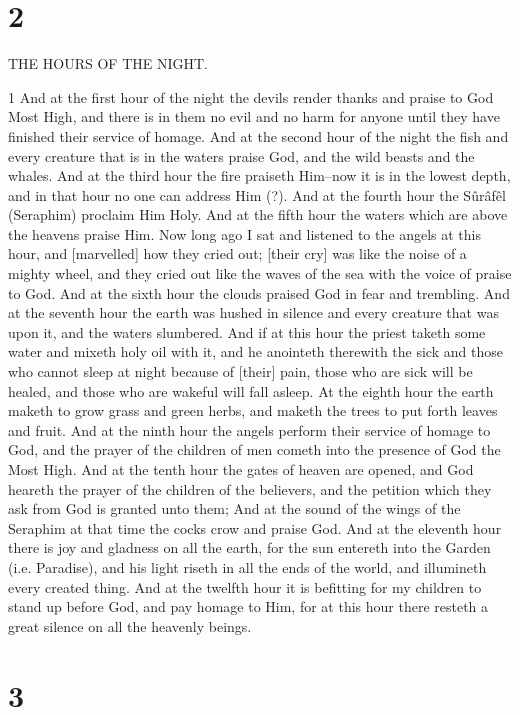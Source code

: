 \chapter{2}

\par THE HOURS OF THE NIGHT.

\par 1 And at the first hour of the night the devils render thanks and praise to God Most High, and there is in them no evil and no harm for anyone until they have finished their service of homage. And at the second hour of the night the fish and every creature that is in the waters praise God, and the wild beasts and the whales. And at the third hour the fire praiseth Him--now it is in the lowest depth, and in that hour no one can address Him (?). And at the fourth hour the Sûrâfêl (Seraphim) proclaim Him Holy. And at the fifth hour the waters which are above the heavens praise Him. Now long ago I sat and listened to the angels at this hour, and [marvelled] how they cried out; [their cry] was like the noise of a mighty wheel, and they cried out like the waves of the sea with the voice of praise to God. And at the sixth hour the clouds praised God in fear and trembling. And at the seventh hour the earth was hushed in silence and every creature that was upon it, and the waters slumbered. And if at this hour the priest taketh some water and mixeth holy oil with it, and he anointeth therewith the sick and those who cannot sleep at night because of [their] pain, those who are sick will be healed, and those who are wakeful will fall asleep. At the eighth hour the earth maketh to grow grass and green herbs, and maketh the trees to put forth leaves and fruit. And at the ninth hour the angels perform their service of homage to God, and the prayer of the children of men cometh into the presence of God the Most High. And at the tenth hour the gates of heaven are opened, and God heareth the prayer of the children of the believers, and the petition which they ask from God is granted unto them; And at the sound of the wings of the Seraphim at that time the cocks crow and praise God. And at the eleventh hour there is joy and gladness on all the earth, for the sun entereth into the Garden (i.e. Paradise), and his light riseth in all the ends of the world, and illumineth every created thing. And at the twelfth hour it is befitting for my children to stand up before God, and pay homage to Him, for at this hour there resteth a great silence on all the heavenly beings.

\chapter{3}

